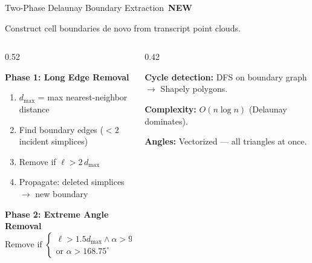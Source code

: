 \documentclass[aspectratio=169,10pt]{beamer}
\newcommand{\NEW}{\,{\scriptsize\colorbox{newgreen}{\color{white}\textbf{NEW}}}\,}
\begin{document}
\begin{frame}{Two-Phase Delaunay Boundary Extraction \NEW}

Construct cell boundaries \alert{de novo} from transcript point clouds.

\vspace{0.1cm}

\begin{columns}[T]
\begin{column}{0.52\textwidth}
{\small
\textbf{Phase 1: Long Edge Removal}
\begin{enumerate}\setlength\itemsep{1pt}
  \item $d_{\max}$ = max nearest-neighbor distance
  \item Find boundary edges ($<2$ incident simplices)
  \item Remove if $\ell > 2\,d_{\max}$
  \item Propagate: deleted simplices $\to$ new boundary
\end{enumerate}

\textbf{Phase 2: Extreme Angle Removal}
\[
  \text{Remove if } \begin{cases}
    \ell > 1.5d_{\max} \wedge \alpha > 90^{\circ} \\
    \text{or } \alpha > 168.75^{\circ}
  \end{cases}
\]
}
\end{column}

\begin{column}{0.42\textwidth}
\begin{center}
\end{center}

{\small
\textbf{Cycle detection:} DFS on boundary graph $\to$ Shapely polygons.

\textbf{Complexity:} $O(n \log n)$ (Delaunay dominates).

\textbf{Angles:} Vectorized --- all triangles at once.
}
\end{column}
\end{columns}
\end{frame}
\end{document}
